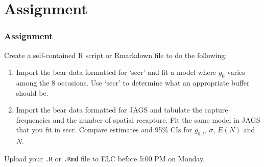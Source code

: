 \documentclass[color=usenames,dvipsnames]{beamer}\usepackage[]{graphicx}\usepackage[]{color}
\begin{document}
\section{Assignment}




\begin{frame}[fragile]
  \frametitle{Assignment}
  Create a self-contained R script or Rmarkdown file to do the
  following: 
  \vfill
  \begin{enumerate}
    \item Import the bear data formatted for `secr' and fit a model
      where $g_0$ varies among the 8 occasions. Use `secr' to
      determine what an appropriate buffer should be.
    \item Import the bear data formatted for JAGS and tabulate the
      capture frequencies and the number of spatial recapture. Fit the
      same model in JAGS that you fit in secr. Compare estimates and 95\% CIs
      for $g_{0,t}$, $\sigma$, $E(N)$ and $N$.  
  \end{enumerate}
  \vfill
  Upload your {\tt .R} or {\tt .Rmd} file to ELC before 5:00 PM on Monday. 
\end{frame}
\end{document}
